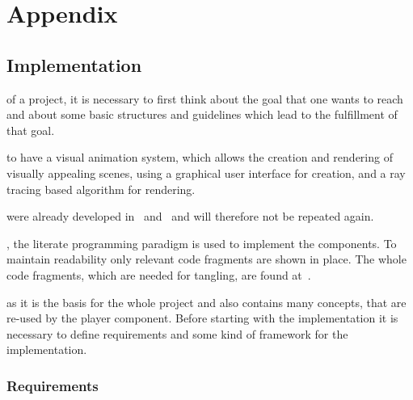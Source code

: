 \documentclass[%
    a4paper,    %
    justified,  %
    nobib,      %
    openany     %
]{tufte-book}
\begin{document}
\backmatter{}


\appendix
\part*{Appendix}


\chapter{Implementation}
\label{appendix:chap:implementation}

 of a project, it is necessary to
first think about the goal that one wants to reach and about some basic
structures and guidelines which lead to the fulfillment of that goal.

 to have a visual animation system, which allows
the creation and rendering of visually appealing scenes, using a graphical user
interface for creation, and a ray tracing based algorithm for
rendering.~

 were already developed
in~ and~ and will
therefore not be repeated again.

, the literate programming
paradigm is used to implement the components. To maintain readability only
relevant code fragments are shown in place. The whole code fragments, which are
needed for tangling, are found at~.

 as it is the basis for the
whole project and also contains many concepts, that are re-used by the player
component. Before starting with the implementation it is necessary to define
requirements and some kind of framework for the implementation.


\section{Requirements}
\label{appendix:sec:requirements}
\end{document}
